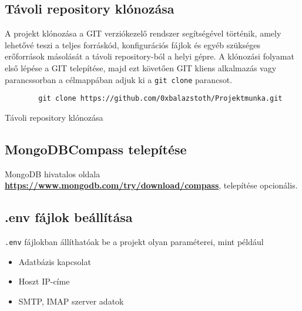 \subsection{Távoli repository klónozása}
\begin{flushleft}
    A projekt klónozása a GIT verziókezelő rendszer segítségével történik, amely lehetővé teszi a teljes forráskód, konfigurációs fájlok és egyéb szükséges erőforrások másolását a távoli repository-ból a helyi gépre. A klónozási folyamat első lépése a GIT telepítése, majd ezt követően GIT kliens alkalmazás vagy parancssorban a célmappában adjuk ki a \verb|git clone| parancsot.
\end{flushleft}
\begin{listing}[H]
    \begin{verbatim}
        git clone https://github.com/0xbalazstoth/Projektmunka.git
    \end{verbatim}
    \caption{Távoli repository klónozása}
    \label{code:repo_clone}
\end{listing}

\subsection{MongoDBCompass telepítése}
\begin{flushleft}
    MongoDB hivatalos oldala \textbf{\href{https://www.mongodb.com/try/download/compass}{https://www.mongodb.com/try/download/compass}}, telepítése opcionális.
\end{flushleft}

\subsection{.env fájlok beállítása}
\begin{flushleft}
    \verb|.env| fájlokban állíthatóak be a projekt olyan paraméterei, mint például
    \begin{itemize}
        \item Adatbázis kapcsolat
        \item Hoszt IP-címe
        \item SMTP, IMAP szerver adatok
    \end{itemize}
\end{flushleft}